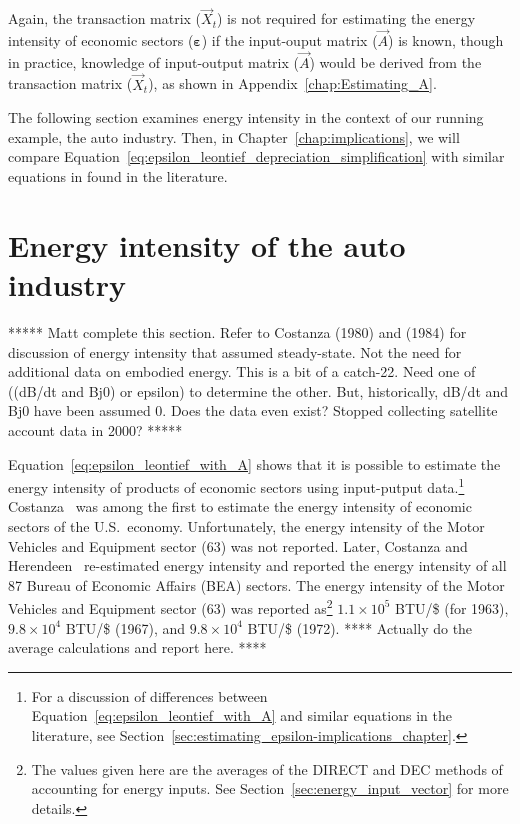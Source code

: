 Again, the transaction matrix ($\vec{X}_{t}$) 
is not required for estimating the energy intensity 
of economic sectors ($\bm{\varepsilon}$)
if the input-ouput matrix ($\vec{A}$) is known, 
though in practice, 
knowledge of input-output matrix ($\vec{A}$) 
would be derived from the transaction matrix ($\vec{X}_{t}$),
as shown in Appendix~\ref{chap:Estimating_A}.

The following section examines energy intensity 
in the context of our running example, the auto industry.
Then, in Chapter~\ref{chap:implications}, we will compare
Equation~\ref{eq:epsilon_leontief_depreciation_simplification}
with similar equations in found in the literature.


\section{Energy intensity of the auto industry}
\label{sec:intensity_auto}

***** Matt complete this section. Refer to Costanza (1980) and (1984)
for discussion of energy intensity that assumed steady-state.
Not the need for additional data on embodied energy. 
This is a bit of a catch-22. Need one of ((dB/dt and Bj0) or epsilon) to determine
the other. But, historically, dB/dt and Bj0 have been assumed 0. 
Does the data even exist?
Stopped collecting satellite account data in 2000?
*****

Equation~\ref{eq:epsilon_leontief_with_A} shows 
that it is possible to estimate the energy intensity 
of products of economic sectors using input-putput data.\footnote{For a discussion
of differences between Equation~\ref{eq:epsilon_leontief_with_A} and
similar equations in the literature, 
see Section~\ref{sec:estimating_epsilon-implications_chapter}.}
Costanza~\cite{Costanza:1980ww} was among the first to estimate 
the energy intensity of economic sectors of the U.S.\ economy.
Unfortunately, the energy intensity 
of the Motor Vehicles and Equipment sector (63) was not reported.
Later, Costanza and Herendeen~\cite{Costanza:1984tq} re-estimated
energy intensity and reported the energy intensity 
of all 87 Bureau of Economic Affairs 
(BEA) sectors.
The energy intensity of the Motor Vehicles and Equipment sector (63) 
was reported as\footnote{The values given here are the averages of the 
DIRECT and DEC methods of accounting for energy inputs. 
See Section~\ref{sec:energy_input_vector} for more details.} 
$1.1\times10^{5}$ BTU/\$ (for 1963),
$9.8\times10^{4}$ BTU/\$ (1967), and
$9.8\times10^{4}$ BTU/\$ (1972).
**** Actually do the average calculations and report here. ****




